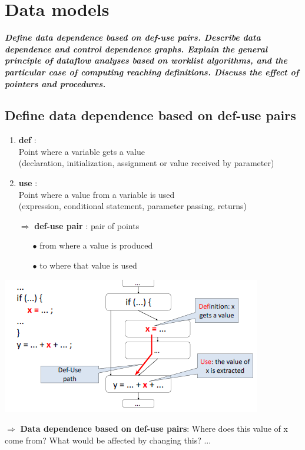 \documentclass{article}
\begin{document}
\newpage
\section{Data models}
\textbf{\textit{Define data dependence based on def-use pairs. Describe data dependence and control dependence graphs. Explain the general principle of dataflow analyses based on worklist algorithms, and the particular case of computing reaching definitions. Discuss the effect of pointers and procedures.}}

\subsection{Define data dependence based on def-use pairs}
\begin{multicols}{2}
\begin{enumerate}
    \item \textbf{def} :\\
    Point where a variable gets a value\\
    (declaration, initialization, assignment or value received by parameter)
    \item \textbf{use} :\\
    Point where a value from a variable is used\\
    (expression, conditional statement, parameter passing, returns)
    \item[$\Rightarrow$] \textbf{def-use pair} : pair of points
    \begin{itemize}
        \item [$\bullet$]from where a value is produced
        \item [$\bullet$]to where that value is used
    \end{itemize}
\end{enumerate}
\vfill\null
\columnbreak
\begin{center}
    \includegraphics[scale = 0.8]{image/8.PNG}
\end{center}
\end{multicols}
\noindent$\Rightarrow$ \textbf{Data dependence based on def-use pairs}: Where does this value of x come from? What would be affected by changing this? ...
\end{document}
